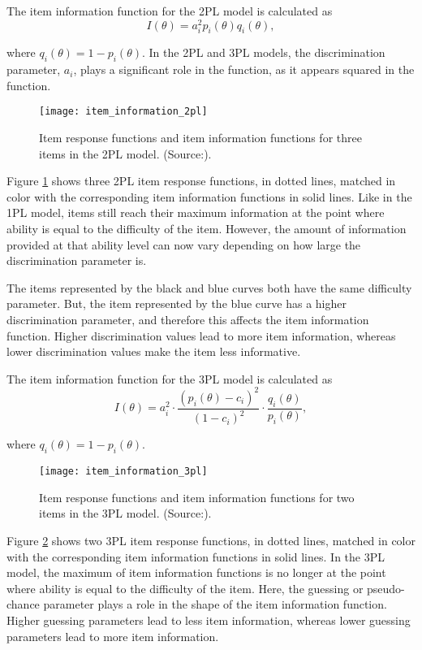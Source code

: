 The item information function for the 2PL model is calculated as
$$I(\theta) = a_i^2 p_i(\theta)q_i(\theta),$$

where $q_i(\theta) = 1-p_i(\theta)$. In the 2PL and 3PL models, the discrimination parameter, $a_i$, plays a significant role in the function, as it appears squared in the function.

\begin{figure}[H]
\centering
\texttt{[image: item\_information\_2pl]}
\caption{Item response functions and item information
functions for three items in the 2PL model. (Source:\cite{Visual-IRT}).}
\label{fig:item_information_2pl}
\end{figure}

Figure \ref{fig:item_information_2pl} shows three 2PL item response functions, in dotted lines, matched in color with the corresponding item information functions in solid lines. Like in the 1PL model, items still reach their maximum information at the point where ability is equal to the difficulty of the item. However, the amount of information provided at that ability level can now vary depending on how large the discrimination parameter is.\newline

The items represented by the black and blue curves both have the same difficulty parameter. But, the item represented by the blue curve has a higher discrimination parameter, and therefore this affects the item information function. Higher discrimination values lead to more item information, whereas lower discrimination values make the item less informative. \newline

The item information function for the 3PL model is calculated as
$$I(\theta) = a_i^2 \cdot \dfrac{(p_i(\theta)-c_i)^2}{(1-c_i)^2} \cdot \dfrac{q_i(\theta)}{p_i(\theta)},$$

where $q_i(\theta) = 1-p_i(\theta)$.

\begin{figure}[H]
\centering
\texttt{[image: item\_information\_3pl]}
\caption{Item response functions and item information
functions for two items in the 3PL model. (Source:\cite{Visual-IRT}).}
\label{fig:item_information_3pl}
\end{figure}

Figure \ref{fig:item_information_3pl} shows two 3PL item response functions, in dotted lines, matched in color with the corresponding item information functions in solid lines. In the 3PL model, the maximum of item information functions is no longer at the point where ability is equal to the difficulty of the item. Here, the guessing or pseudo-chance parameter plays a role in the shape of the item information function. Higher guessing parameters lead to less item information, whereas lower guessing parameters lead to more item information.

